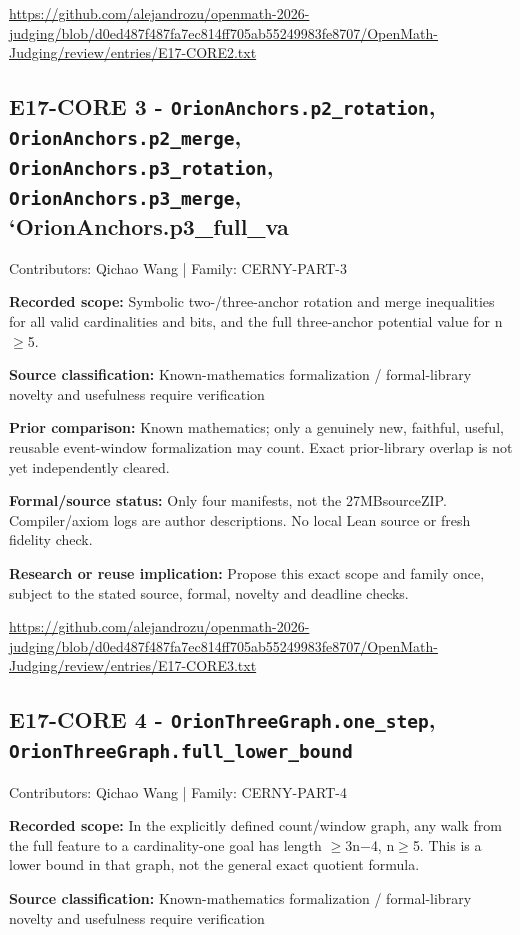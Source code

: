 \documentclass[11pt,a4paper]{article}
\begin{document}
{\small \url{https://github.com/alejandrozu/openmath-2026-judging/blob/d0ed487f487fa7ec814ff705ab55249983fe8707/OpenMath-Judging/review/entries/E17-CORE2.txt}\par}

\begin{samepage}
\subsection{E17-CORE 3  -  \texttt{OrionAnchors.p2\_rotation}, \texttt{OrionAnchors.p2\_merge}, \texttt{OrionAnchors.p3\_rotation}, \texttt{OrionAnchors.p3\_merge}, `OrionAnchors.p3\_full\_va}
{\small Contributors: Qichao Wang | Family: CERNY-PART-3\par}

\textbf{Recorded scope:} Symbolic two-/three-anchor rotation and merge inequalities for all valid cardinalities and bits, and the full three-anchor potential value for n\ensuremath{\geq}5.

\end{samepage}
\textbf{Source classification:} Known-mathematics formalization / formal-library novelty and usefulness require verification

\textbf{Prior comparison:} Known mathematics; only a genuinely new, faithful, useful, reusable event-window formalization may count. Exact prior-library overlap is not yet independently cleared.

\textbf{Formal/source status:} Only four manifests, not the 27MBsourceZIP. Compiler/axiom logs are author descriptions. No local Lean source or fresh fidelity check.

\textbf{Research or reuse implication:} Propose this exact scope and family once, subject to the stated source, formal, novelty and deadline checks.

{\small \url{https://github.com/alejandrozu/openmath-2026-judging/blob/d0ed487f487fa7ec814ff705ab55249983fe8707/OpenMath-Judging/review/entries/E17-CORE3.txt}\par}

\begin{samepage}
\subsection{E17-CORE 4  -  \texttt{OrionThreeGraph.one\_step}, \texttt{OrionThreeGraph.full\_lower\_bound}}
{\small Contributors: Qichao Wang | Family: CERNY-PART-4\par}

\textbf{Recorded scope:} In the explicitly defined count/window graph, any walk from the full feature to a cardinality-one goal has length \ensuremath{\geq}3n\ensuremath{-}4, n\ensuremath{\geq}5. This is a lower bound in that graph, not the general exact quotient formula.

\end{samepage}
\textbf{Source classification:} Known-mathematics formalization / formal-library novelty and usefulness require verification
\end{document}
